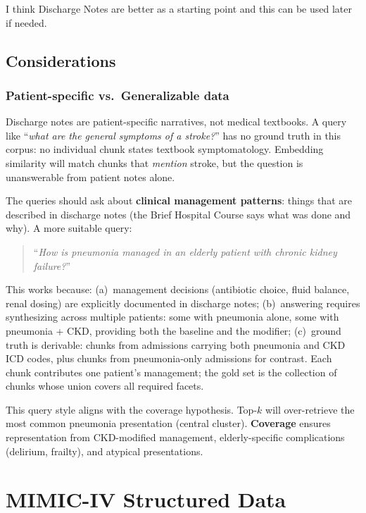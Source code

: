 \documentclass[11pt,a4paper]{article}
\begin{document}
I think Discharge Notes are better as a starting point and this can be used later if needed.
\bigskip

\subsection{Considerations}

\subsubsection{Patient-specific vs.\ Generalizable data}
\label{sec:tension}

Discharge notes are patient-specific narratives, not medical textbooks.  A query like ``\emph{what are the general symptoms of a stroke?}'' has no ground truth in this corpus: no individual chunk states textbook symptomatology.  Embedding similarity will match chunks that \emph{mention} stroke, but the question is unanswerable from patient notes alone.

The queries should ask about \textbf{clinical management patterns}: things that are described in discharge notes (the Brief Hospital Course says what was done and why).  A more suitable query:
\begin{quote}
	\small
	``\emph{How is pneumonia managed in an elderly patient with chronic kidney failure?}''
\end{quote}

This works because: (a)~management decisions (antibiotic choice, fluid balance, renal dosing) are explicitly documented in discharge notes; (b)~answering requires synthesizing across multiple patients: some with pneumonia alone, some with pneumonia + CKD, providing both the baseline and the modifier; (c)~ground truth is derivable: chunks from admissions carrying both pneumonia and CKD ICD codes, plus chunks from pneumonia-only admissions for contrast.  Each chunk contributes one patient's management; the gold set is the collection of chunks whose union covers all required facets.

This query style aligns with the coverage hypothesis.  Top-$k$ will over-retrieve the most common pneumonia presentation (central cluster). \textbf{Coverage} ensures representation from CKD-modified management, elderly-specific complications (delirium, frailty), and atypical presentations.

\section{MIMIC-IV Structured Data}
\label{sec:structured-data-detail}
\end{document}

